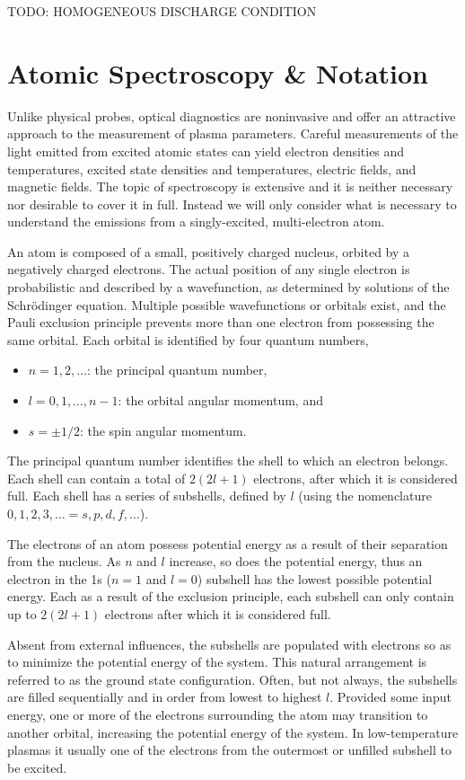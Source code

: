 TODO: HOMOGENEOUS DISCHARGE CONDITION

\section{Atomic Spectroscopy \& Notation}

Unlike physical probes, optical diagnostics are noninvasive and offer an
attractive approach to the measurement of plasma parameters. Careful
measurements of the light emitted from excited atomic states can yield electron
densities and temperatures, excited state densities and temperatures, electric
fields, and magnetic fields. The topic of spectroscopy is extensive and it is
neither necessary nor desirable to cover it in full. Instead we will only
consider what is necessary to understand the emissions from a singly-excited,
multi-electron atom.

An atom is composed of a small, positively charged nucleus, orbited by a
negatively charged electrons. The actual position of any single electron is
probabilistic and described by a wavefunction, as determined by solutions of the
Schr\"{o}dinger equation. Multiple possible wavefunctions or orbitals exist, and
the Pauli exclusion principle prevents more than one electron from possessing
the same orbital. Each orbital is identified by four quantum numbers,
\begin{itemize}
  \item $n=1,2,\ldots$: the principal quantum number,
  \item $l=0,1,\ldots,n-1$: the orbital angular momentum, and
  \item $s=\pm1/2$: the spin angular momentum.
\end{itemize}
The principal quantum number identifies the shell to which an electron belongs.
Each shell can contain a total of $2(2l+1)$ electrons, after which it is
considered full. Each shell has a series of subshells, defined by $l$ (using the
nomenclature $0,1,2,3,\ldots = s,p,d,f,\ldots$). 

The electrons of an atom possess potential energy as a result of their
separation from the nucleus. As $n$ and $l$ increase, so does the potential
energy, thus an electron in the 1s ($n=1$ and $l=0$) subshell has the lowest
possible potential energy. Each as a result of the exclusion principle, each
subshell can only contain up to $2(2l+1)$ electrons after which it is considered
full.

Absent from external influences, the subshells are populated with electrons so
as to minimize the potential energy of the system. This natural arrangement is
referred to as the ground state configuration. Often, but not always, the
subshells are filled sequentially and in order from lowest to highest $l$.
Provided some input energy, one or more of the electrons surrounding the atom
may transition to another orbital, increasing the potential energy of the
system. In low-temperature plasmas it usually one of the electrons from the
outermost or unfilled subshell to be excited.

